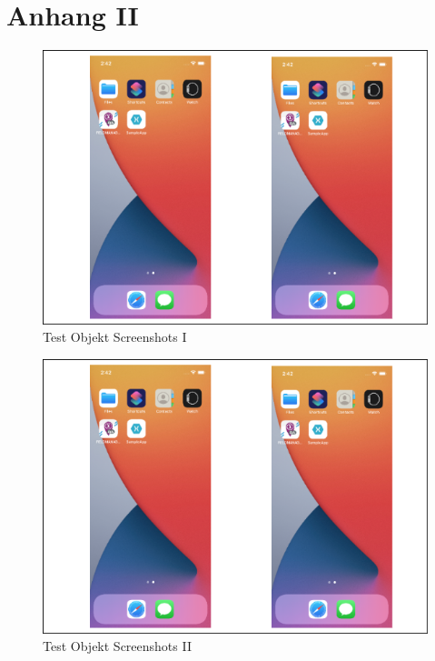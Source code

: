 \chapter{Anhang II}
\label{chap:AnhangAndroidScreenshots}

\begin{figure}[!ht]
 \includegraphics[width=\textwidth,keepaspectratio]{Images/Screenshot/AppIconAndMenu.png}
 \caption{Test Objekt Screenshots I}
 \label{fig:TestObjectI}
\end{figure}

\begin{figure}[!ht]
 \includegraphics[width=\textwidth,keepaspectratio]{Images/Screenshot/AppIconAndMenu.png}
 \caption{Test Objekt Screenshots II}
 \label{fig:TestObjectI}
\end{figure}

